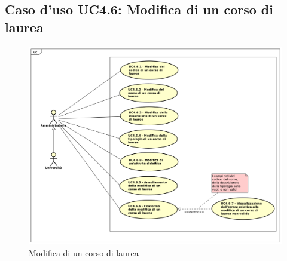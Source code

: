 \subsection{Caso d'uso \texorpdfstring{UC4.6}{UC4.6}: Modifica di un corso di laurea}
\begin{figure} [H]
	\centering
	\includegraphics[scale=0.45]{./img/UC4-6.pdf}
	\caption{Modifica di un corso di laurea}\label{}
\end{figure}
